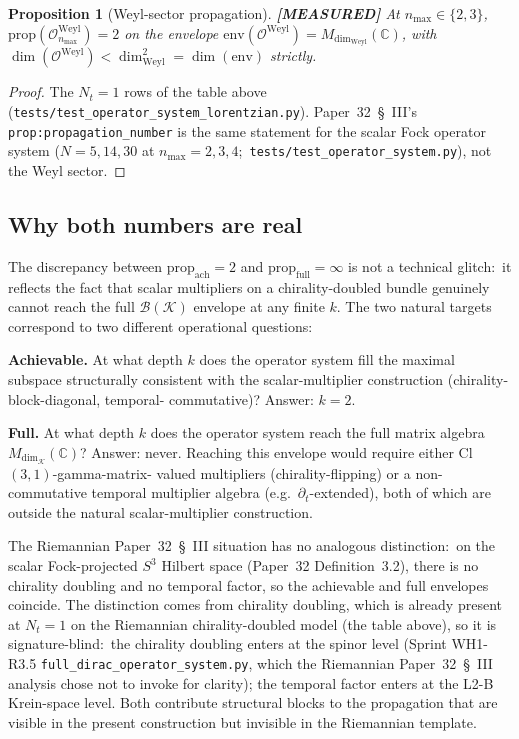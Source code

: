 \documentclass[11pt,a4paper]{article}
\theoremstyle{plain}
\newtheorem{proposition}[theorem]{Proposition}
\theoremstyle{definition}
\newcommand{\nmax}{n_{\max}}
\newcommand{\Nt}{N_t}
\newcommand{\sthree}{S^{3}}
\newcommand{\Krein}{\mathcal{K}}
\newcommand{\Op}{\mathcal{O}}
\newcommand{\Bcal}{\mathcal{B}}
\newcommand{\C}{\mathbb{C}}
\newcommand{\Mat}{M}
\newcommand{\prop}{\mathrm{prop}}
\newcommand{\Weyl}{\mathrm{Weyl}}
\newcommand{\achievable}{\mathrm{ach}}
\begin{document}
\begin{proposition}[Weyl-sector propagation]
\label{prop:paper32_prop}
\textbf{[MEASURED]} At $\nmax \in \{2, 3\}$,
$\prop(\Op_{\nmax}^\Weyl) = 2$ on the envelope
$\mathrm{env}(\Op^\Weyl) = \Mat_{\dim_\Weyl}(\C)$, with
$\dim(\Op^\Weyl) < \dim_\Weyl^2 = \dim(\mathrm{env})$ strictly.
\end{proposition}

\begin{proof}
The $\Nt = 1$ rows of the table above
(\texttt{tests/test\_operator\_system\_lorentzian.py}). Paper~32~\S~III's
\texttt{prop:propagation\_number} is the same statement for the scalar
Fock operator system ($N = 5, 14, 30$ at $\nmax = 2, 3, 4$;\
\texttt{tests/test\_operator\_system.py}), not the Weyl sector.
\end{proof}

\subsection{Why both numbers are real}\label{sec:both_real}

The discrepancy between $\prop_\achievable = 2$ and
$\prop_{\mathrm{full}} = \infty$ is not a technical glitch:\ it reflects
the fact that scalar multipliers on a chirality-doubled bundle
genuinely cannot reach the full $\Bcal(\Krein)$ envelope at any finite
$k$. The two natural targets correspond to two different operational
questions:

\medskip\noindent
\textbf{Achievable.} At what depth $k$ does the operator system fill
the maximal subspace structurally consistent with the
scalar-multiplier construction (chirality-block-diagonal, temporal-%
commutative)?  Answer: $k = 2$.

\medskip\noindent
\textbf{Full.} At what depth $k$ does the operator system reach the
full matrix algebra $\Mat_{\dim_\Krein}(\C)$?  Answer: never.
Reaching this envelope would require either Cl$(3, 1)$-gamma-matrix-%
valued multipliers (chirality-flipping) or a non-commutative temporal
multiplier algebra (e.g.\ $\partial_t$-extended), both of which are
outside the natural scalar-multiplier construction.

The Riemannian Paper~32~\S~III situation has no analogous distinction:\
on the scalar Fock-projected $\sthree$ Hilbert space (Paper~32
Definition~3.2), there is no chirality doubling and no temporal
factor, so the achievable and full envelopes coincide. The
distinction comes from chirality doubling, which is already present at
$\Nt = 1$ on the Riemannian chirality-doubled model (the table above),
so it is signature-blind:\ the chirality doubling enters at the spinor level (Sprint WH1-R3.5
\texttt{full\_dirac\_operator\_system.py}, which the Riemannian
Paper~32~\S~III analysis chose not to invoke for clarity); the
temporal factor enters at the L2-B Krein-space level. Both
contribute structural blocks to the propagation that are visible in
the present construction but invisible in the Riemannian template.
\end{document}
